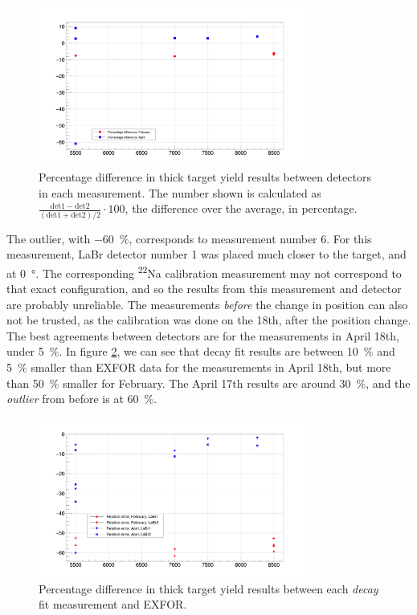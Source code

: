 \documentclass[a4paper,12pt]{report}
\newcommand{\Na}{\textsuperscript{22}Na }
\begin{document}
\begin{figure}[H]
	\centering
	\includegraphics[width=0.80\textwidth]{decay_errors_rel_per.png}
	\caption{Percentage difference in thick target yield results between detectors in each measurement.
	The number shown is calculated as $\frac{\text{det}1-\text{det}2}{\left(\text{det}1+\text{det}2\right)/2}\cdot 100$, the difference over the average, in percentage.}
	\label{decay_errors_rel_per}
\end{figure}

The outlier, with \qty{-60}{\percent}, corresponds to measurement number 6.
For this measurement, LaBr detector number 1 was placed much closer to the target, and at \qty{0}{\degree}.
The corresponding \Na calibration measurement may not correspond to that exact configuration, and so the results from this measurement and detector are probably unreliable.
The measurements \emph{before} the change in position can also not be trusted, as the calibration was done on the 18th, after the position change.
\\

The best agreements between detectors are for the measurements in April 18th, under \qty{5}{\percent}.
In figure \ref{decay_errors_per}, we can see that decay fit results are between \qty{10}{\percent} and \qty{5}{\percent} smaller than EXFOR data for the measurements in April 18th, but more than \qty{50}{\percent} smaller for February.
The April 17th results are around \qty{30}{\percent}, and the \textit{outlier} from before is at \qty{60}{\percent}.

\begin{figure}[H]
	\centering
	\includegraphics[width=0.80\textwidth]{decay_errors_per.png}
	\caption{Percentage difference in thick target yield results between each \textit{decay} fit measurement and EXFOR.}
	\label{decay_errors_per}
\end{figure}
\end{document}
